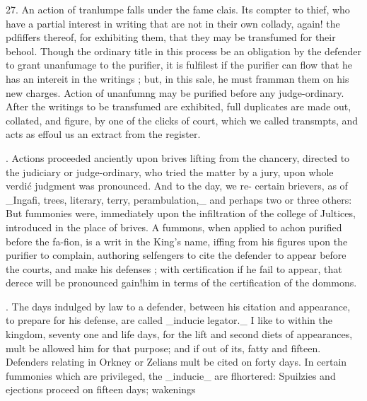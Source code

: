 27. An action of tranlumpe falls under the fame clais. Its compter to thief, who have a partial interest in writing that are not in their own collady, again! the pdfiffers thereof, for exhibiting them, that they may be transfumed for their behool. Though the ordinary title in this process be an obligation by the defender to grant unanfumage to the purifier, it is fulfilest if the purifier can flow that he has an intereit in the writings ; but, in this sale, he must framman them on his new charges. Action of unanfumng may be purified before any judge-ordinary. After the writings to be transfumed are exhibited, full duplicates are made out, collated, and figure, by one of the clicks of court, which we called transmpts, and acts as effoul us an extract from the register.\par{}. Actions proceeded anciently upon brives lifting from the chancery, directed to the judiciary or judge-ordinary, who tried the matter by a jury, upon whole verdić judgment was pronounced. And to the day, we re- certain brievers, as of \_Ingafi, trees, literary, terry, perambulation,\_ and perhaps two or three others: But fummonies were, immediately upon the infiltration of the college of Jultices, introduced in the place of brives. A fummons, when applied to achon purified before the fa-fion, is a writ in the King's name, iffing from his figures upon the purifier to complain, authoring selfengers to cite the defender to appear before the courts, and make his defenses ; with certification if he fail to appear, that derece will be pronounced gain!him in terms of the certification of the dommons.\par{}. The days indulged by law to a defender, between his citation and appearance, to prepare for his defense, are called \_inducie legator.\_ I like to within the kingdom, seventy one and life days, for the lift and second diets of appearances, mult be allowed him for that purpose; and if out of its, fatty and fifteen. Defenders relating in Orkney or Zelians mult be cited on forty days. In certain fummonies which are privileged, the \_inducie\_ are flhortered: Spuilzies and ejections proceed on fifteen days; wakenings\par\medskip
